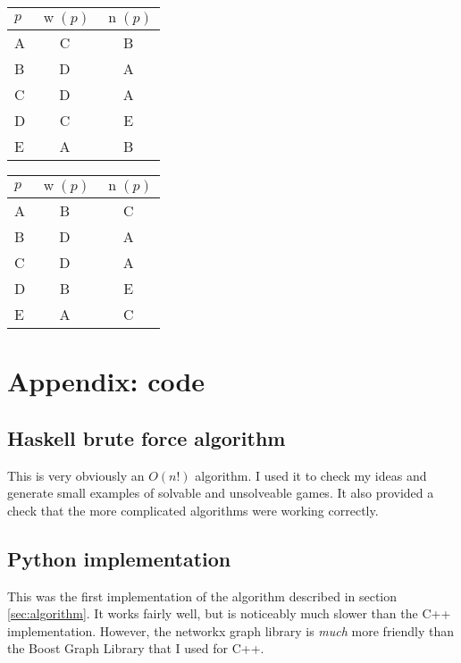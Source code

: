\documentclass[12pt]{article}
\DeclareMathOperator{\w}{w}
\DeclareMathOperator{\n}{n}
\begin{document}
    \begin{multicols}{2}
        \begin{tabular}{l | c | c}
             $p$ & $\w(p)$ & $\n(p)$ \\
             \hline
             A &  C& B\\
             B &  D& A\\
             C &  D& A\\
             D &  C& E\\
             E &  A& B\\
        \end{tabular}


        \columnbreak
        \begin{tabular}{l | c | c}
             $p$ & $\w(p)$ & $\n(p)$ \\
             \hline
             A &  B& C\\
             B &  D& A\\
             C &  D& A\\
             D &  B& E\\
             E &  A& C\\
        \end{tabular}
    \end{multicols}


\section{Appendix: code}
    \renewcommand{\ttdefault}{pcr}
    \subsection{Haskell brute force algorithm}
        This is very obviously an $O(n!)$ algorithm. I used it to check my ideas and generate small examples of solvable and unsolveable games. It also provided a check that the more complicated algorithms were working correctly.
        
    \subsection{Python implementation}
        This was the first implementation of the algorithm described in section \ref{sec:algorithm}. It works fairly well, but is noticeably much slower than the C++ implementation. However, the networkx graph library is \emph{much} more friendly than the Boost Graph Library that I used for C++.
        
\end{document}
